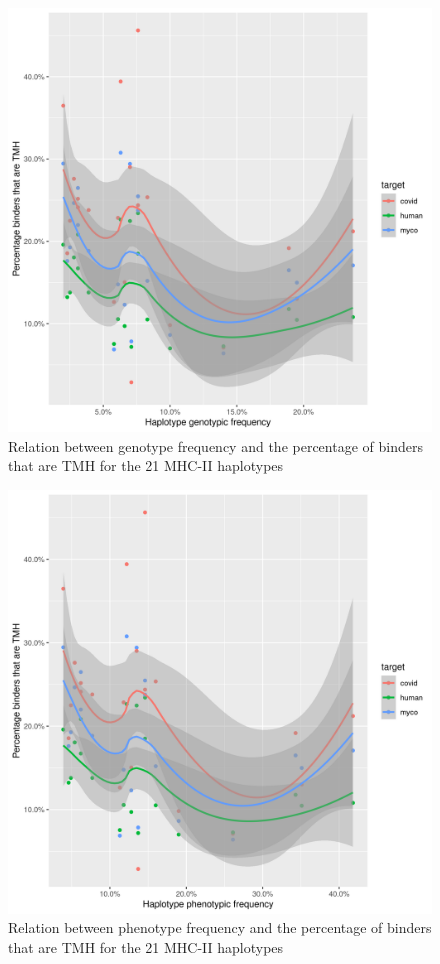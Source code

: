 \begin{figure}[!htbp]
  \includegraphics[width=\textwidth]{haplotype_freq_vs_f_tmh_epitopes/haplotype_perc_vs_f_tmh_binders.png}
  \caption{
    Relation between genotype frequency and the percentage
    of binders that are TMH for the 21 MHC-II haplotypes
  }
  \label{fig:haplotype_perc_vs_f_tmh_binders}
\end{figure}

\begin{figure}[!htbp]
  \includegraphics[width=\textwidth]{haplotype_freq_vs_f_tmh_epitopes/phenotype_freq_vs_f_tmh_binders.png}
  \caption{
    Relation between phenotype frequency and the percentage
    of binders that are TMH for the 21 MHC-II haplotypes
  }
  \label{fig:phenotype_freq_vs_f_tmh_binders}
\end{figure}


